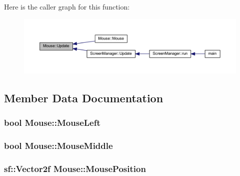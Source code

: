 Here is the caller graph for this function\-:\nopagebreak
\begin{figure}[H]
\begin{center}
\leavevmode
\includegraphics[width=350pt]{class_mouse_add9756fabb1ae55d56e10b930e5592b6_icgraph}
\end{center}
\end{figure}




\subsection{Member Data Documentation}
\hypertarget{class_mouse_ace644d872e798ce789726ec958236428}{
\subsubsection[{Mouse\-Left}]{\setlength{\rightskip}{0pt plus 5cm}bool Mouse\-::\-Mouse\-Left\hspace{0.3cm}{\ttfamily [private]}}}\label{class_mouse_ace644d872e798ce789726ec958236428}
\hypertarget{class_mouse_a4cbf96ff26822cc0eb8ea3f73a9edc9a}{
\subsubsection[{Mouse\-Middle}]{\setlength{\rightskip}{0pt plus 5cm}bool Mouse\-::\-Mouse\-Middle\hspace{0.3cm}{\ttfamily [private]}}}\label{class_mouse_a4cbf96ff26822cc0eb8ea3f73a9edc9a}
\hypertarget{class_mouse_ae83f237e6ca4e0f366eb6f1a03964886}{
\subsubsection[{Mouse\-Position}]{\setlength{\rightskip}{0pt plus 5cm}sf\-::\-Vector2f Mouse\-::\-Mouse\-Position\hspace{0.3cm}{\ttfamily [private]}}}\label{class_mouse_ae83f237e6ca4e0f366eb6f1a03964886}
